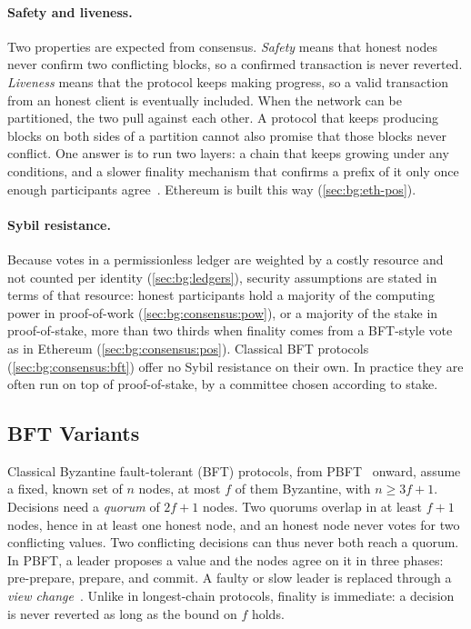 \paragraph{Safety and liveness.}
Two properties are expected from consensus.
\emph{Safety} means that honest nodes never confirm two conflicting blocks, so a confirmed transaction is never reverted.
\emph{Liveness} means that the protocol keeps making progress, so a valid transaction from an honest client is eventually included.
When the network can be partitioned, the two pull against each other.
A protocol that keeps producing blocks on both sides of a partition cannot also promise that those blocks never conflict.
One answer is to run two layers: a chain that keeps growing under any conditions, and a slower finality mechanism that confirms a prefix of it only once enough participants agree~\cite{neu2021ebb}.
Ethereum is built this way (\autoref{sec:bg:eth-pos}).

\paragraph{Sybil resistance.}
Because votes in a permissionless ledger are weighted by a costly resource and not counted per identity (\autoref{sec:bg:ledgers}), security assumptions are stated in terms of that resource: honest participants hold a majority of the computing power in proof-of-work (\autoref{sec:bg:consensus:pow}), or a majority of the stake in proof-of-stake, more than two thirds when finality comes from a BFT-style vote as in Ethereum (\autoref{sec:bg:consensus:pos}).
Classical BFT protocols (\autoref{sec:bg:consensus:bft}) offer no Sybil resistance on their own.
In practice they are often run on top of proof-of-stake, by a committee chosen according to stake.

\subsection{BFT Variants}\label{sec:bg:consensus:bft}

Classical Byzantine fault-tolerant (BFT) protocols, from PBFT~\cite{castro1999pbft} onward, assume a fixed, known set of $n$ nodes, at most $f$ of them Byzantine, with $n \geq 3f+1$.
Decisions need a \emph{quorum} of $2f+1$ nodes.
Two quorums overlap in at least $f+1$ nodes, hence in at least one honest node, and an honest node never votes for two conflicting values.
Two conflicting decisions can thus never both reach a quorum.
In PBFT, a leader proposes a value and the nodes agree on it in three phases: pre-prepare, prepare, and commit.
A faulty or slow leader is replaced through a \emph{view change}~\cite{castro1999pbft}.
Unlike in longest-chain protocols, finality is immediate: a decision is never reverted as long as the bound on $f$ holds.

